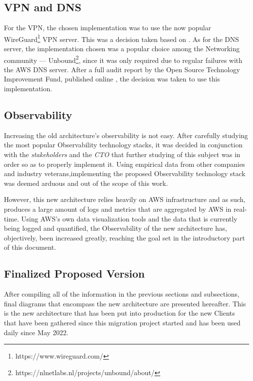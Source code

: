 \subsection{VPN and DNS}\label{methodology:ss:vpn-and-dns}

For the VPN, the chosen implementation was to use the now popular WireGuard\footnote{https://www.wireguard.com/\label{foot:wireguard}} VPN server. This was a decision taken based on \parencite{ndss_wireguard}.
As for the DNS server, the implementation chosen was a popular choice among the Networking community --- Unbound\footnote{https://nlnetlabs.nl/projects/unbound/about/}, since it was only required due to regular failures with the AWS DNS server. After a full audit report by the Open Source Technology Improvement Fund, published online \parencite{ostif_2022}, the decision was taken to use this implementation.

\subsection{Observability}\label{methodology:ss:new-observability}

Increasing the old architecture's observability is not easy. After carefully studying the most popular Observability technology stacks, it was decided in conjunction with the \textit{stakeholders} and the \textit{CTO} that further studying of this subject was in order so as to properly implement it. Using empirical data from other companies and industry veterans,implementing the proposed Observability technology stack was deemed arduous and out of the scope of this work.

However, this new architecture relies heavily on AWS infrastructure and as such, produces a large amount of logs and metrics that are aggregated by AWS in real-time. Using AWS's own data visualization tools and the data that is currently being logged and quantified, the Observability of the new architecture has, objectively, been increased greatly, reaching the goal set in the introductory part of this document.

\subsection{Finalized Proposed Version}\label{methodology:ss:finalized-proposed-version}

After compiling all of the information in the previous sections and subsections, final diagrams that encompass the new architecture are presented hereafter. This is the new architecture that has been put into production for the new Clients that have been gathered since this migration project started and has been used daily since May 2022. 

